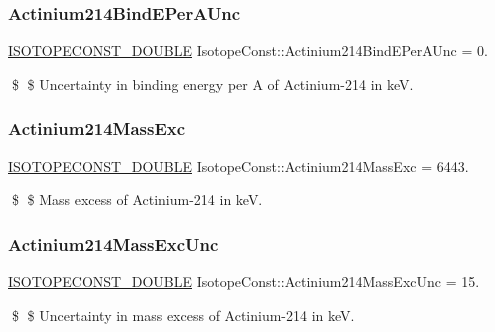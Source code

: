 \subsubsection{\texorpdfstring{Actinium214\+Bind\+E\+Per\+A\+Unc}{Actinium214BindEPerAUnc}}
{\footnotesize\ttfamily \mbox{\hyperlink{group___isotope_const-_macros_ga8f45a7272ce02c0b4c65c44636ed719a}{I\+S\+O\+T\+O\+P\+E\+C\+O\+N\+S\+T\+\_\+\+D\+O\+U\+B\+LE}} Isotope\+Const\+::\+Actinium214\+Bind\+E\+Per\+A\+Unc = 0.}

\$ \$ Uncertainty in binding energy per A of Actinium-\/214 in keV. \mbox{\label{group___isotope_const-_actinium-_ac214_ga7008818a4719ee68aa6b4be69db3242a}} 
\subsubsection{\texorpdfstring{Actinium214\+Mass\+Exc}{Actinium214MassExc}}
{\footnotesize\ttfamily \mbox{\hyperlink{group___isotope_const-_macros_ga8f45a7272ce02c0b4c65c44636ed719a}{I\+S\+O\+T\+O\+P\+E\+C\+O\+N\+S\+T\+\_\+\+D\+O\+U\+B\+LE}} Isotope\+Const\+::\+Actinium214\+Mass\+Exc = 6443.}

\$ \$ Mass excess of Actinium-\/214 in keV. \mbox{\label{group___isotope_const-_actinium-_ac214_ga0589bc152b289c4b1e2e54eca0aa4580}} 
\subsubsection{\texorpdfstring{Actinium214\+Mass\+Exc\+Unc}{Actinium214MassExcUnc}}
{\footnotesize\ttfamily \mbox{\hyperlink{group___isotope_const-_macros_ga8f45a7272ce02c0b4c65c44636ed719a}{I\+S\+O\+T\+O\+P\+E\+C\+O\+N\+S\+T\+\_\+\+D\+O\+U\+B\+LE}} Isotope\+Const\+::\+Actinium214\+Mass\+Exc\+Unc = 15.}

\$ \$ Uncertainty in mass excess of Actinium-\/214 in keV. \mbox{\label{group___isotope_const-_actinium-_ac214_ga1c36abc45f47bc6a728468be1a87d851}} 
